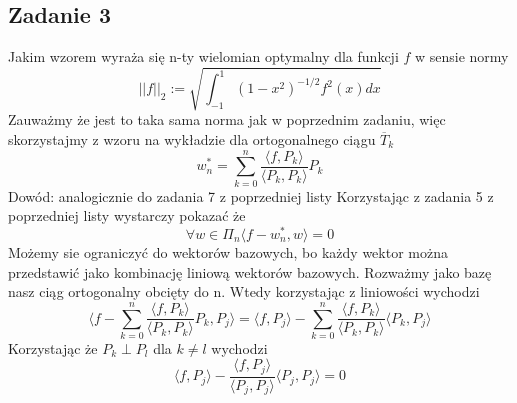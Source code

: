 \documentclass{article}
\begin{document}
\subsection*{Zadanie 3}
Jakim wzorem wyraża się n-ty wielomian optymalny dla funkcji $f$ w sensie normy
\[
  ||f||_2 := \sqrt{\int^1_{-1} 
    (1-x^2)^{-1/2} f^2 (x) dx
  }  
\]
Zauważmy że jest to taka sama norma jak w poprzednim zadaniu, więc skorzystajmy z wzoru na wykładzie dla ortogonalnego ciągu $\overline{T}_k$
\[
  w^*_n = \sum^n_{k=0} \frac{\langle f, P_k \rangle}{\langle P_k , P_k \rangle} P_k  
\]
Dowód:
analogicznie do zadania 7 z poprzedniej listy
Korzystając z zadania 5 z poprzedniej listy wystarczy pokazać że
\[ 
    \forall w \in \Pi_n \langle f - w^*_n , w \rangle = 0 
\]
Możemy sie ograniczyć do wektorów bazowych, bo każdy wektor można przedstawić jako kombinację liniową wektorów bazowych. Rozważmy jako bazę nasz ciąg ortogonalny obcięty do n.
Wtedy korzystając z liniowości wychodzi
\[
  \langle f -  \sum^n_{k=0} \frac{\langle f, P_k \rangle}{\langle P_k , P_k \rangle} P_k, P_j \rangle = \langle f, P_j \rangle - \sum^n_{k=0} \frac{\langle f, P_k \rangle}{\langle P_k , P_k \rangle}\langle  P_k, P_j \rangle
\]
Korzystając że $P_k \perp P_l$ dla $k \neq l$ wychodzi
\[
  \langle f, P_j\rangle - \frac{\langle f , P_j \rangle}{\langle P_j , P_j \rangle} \langle P_j, P_j \rangle = 0
\]
\end{document}
